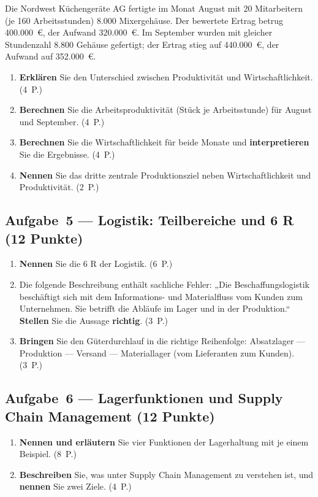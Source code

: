 \documentclass[11pt, a4paper]{article}
\begin{document}
Die Nordwest Küchengeräte AG fertigte im Monat August mit 20 Mitarbeitern
(je 160 Arbeitsstunden) 8.000 Mixergehäuse. Der bewertete Ertrag betrug 400.000~€,
der Aufwand 320.000~€. Im September wurden mit gleicher Stundenzahl 8.800 Gehäuse
gefertigt; der Ertrag stieg auf 440.000~€, der Aufwand auf 352.000~€.

\begin{enumerate}[label=(\alph*)]
  \item \textbf{Erklären} Sie den Unterschied zwischen Produktivität und Wirtschaftlichkeit. \hfill (4~P.)
  \item \textbf{Berechnen} Sie die Arbeitsproduktivität (Stück je Arbeitsstunde) für August und September. \hfill (4~P.)
  \item \textbf{Berechnen} Sie die Wirtschaftlichkeit für beide Monate und \textbf{interpretieren} Sie die Ergebnisse. \hfill (4~P.)
  \item \textbf{Nennen} Sie das dritte zentrale Produktionsziel neben Wirtschaftlichkeit und Produktivität. \hfill (2~P.)
\end{enumerate}

\subsection*{Aufgabe~5 --- Logistik: Teilbereiche und 6 R (12 Punkte)}

\begin{enumerate}[label=(\alph*)]
  \item \textbf{Nennen} Sie die 6 R der Logistik. \hfill (6~P.)
  \item Die folgende Beschreibung enthält sachliche Fehler: „Die Beschaffungslogistik beschäftigt sich mit dem Informations- und Materialfluss vom Kunden zum Unternehmen. Sie betrifft die Abläufe im Lager und in der Produktion.`` \textbf{Stellen} Sie die Aussage \textbf{richtig}. \hfill (3~P.)
  \item \textbf{Bringen} Sie den Güterdurchlauf in die richtige Reihenfolge: Absatzlager --- Produktion --- Versand --- Materiallager (vom Lieferanten zum Kunden). \hfill (3~P.)
\end{enumerate}

\subsection*{Aufgabe~6 --- Lagerfunktionen und Supply Chain Management (12 Punkte)}

\begin{enumerate}[label=(\alph*)]
  \item \textbf{Nennen und erläutern} Sie vier Funktionen der Lagerhaltung mit je einem Beispiel. \hfill (8~P.)
  \item \textbf{Beschreiben} Sie, was unter Supply Chain Management zu verstehen ist, und \textbf{nennen} Sie zwei Ziele. \hfill (4~P.)
\end{enumerate}
\end{document}

